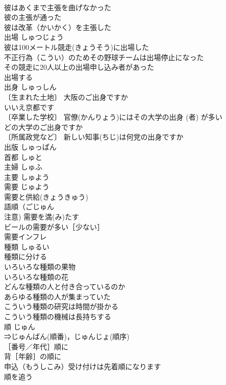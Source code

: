 \documentclass[8pt]{extreport}
\begin{document}
\begin{CJK}{UTF8}{min}
\\	彼はあくまで主張を曲げなかった 
\\	彼の主張が通った 
\\	彼は改革（かいかく）を主張した 
\\	出場	しゅつじょう	
\\	彼は100メートル競走(きょうそう)に出場した 
\\	不正行為（こうい）のためその野球チームは出場停止になった 
\\	その競走に20人以上の出場申し込み者があった 
\\	出場する 
\\	出身	しゅっしん	
\\	〔生まれた土地〕 大阪のご出身ですか
\\	いいえ京都です 
\\	〔卒業した学校〕 官僚(かんりょう)にはその大学の出身 (者) が多い 
\\	どの大学のご出身ですか 
\\	〔所属政党など〕 新しい知事(ちじ)は何党の出身ですか 
\\	出版	しゅっぱん	
\\	首都	しゅと	
\\	主婦	しゅふ	
\\	主要	しゅよう	
\\	需要	じゅよう	
\\	需要と供給(きょうきゅう) 
\\	語順（ごじゅん　
\\	注意) 需要を満(み)たす 
\\	ビールの需要が多い［少ない］ 
\\	需要インフレ 
\\	種類	しゅるい	
\\	種類に分ける 
\\	いろいろな種類の果物 
\\	いろいろな種類の花 
\\	どんな種類の人と付き合っているのか 
\\	あらゆる種類の人が集まっていた 
\\	こういう種類の研究は時間が掛かる 
\\	こういう種類の機械は長持ちする 
\\	順	じゅん	
\\	⇒じゅんばん(順番)，じゅんじょ(順序) 
\\	［番号／年代］順に 
\\	背［年齢］の順に 
\\	申込（もうしこみ）受け付けは先着順になります 
\\	順を追う 

\end{CJK}
\end{document}
